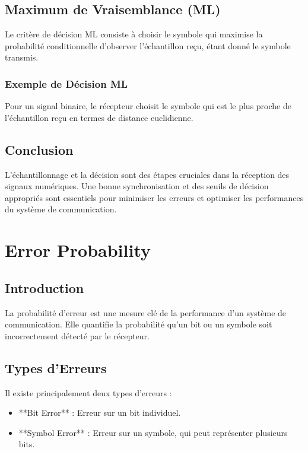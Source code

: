 \documentclass[10pt,a4paper]{article}
\begin{document}
\subsection*{Maximum de Vraisemblance (ML)}
Le critère de décision ML consiste à choisir le symbole qui maximise la probabilité conditionnelle d'observer l'échantillon reçu, étant donné le symbole transmis.

\subsubsection*{Exemple de Décision ML}
Pour un signal binaire, le récepteur choisit le symbole qui est le plus proche de l'échantillon reçu en termes de distance euclidienne.

\subsection*{Conclusion}
L'échantillonnage et la décision sont des étapes cruciales dans la réception des signaux numériques. Une bonne synchronisation et des seuils de décision appropriés sont essentiels pour minimiser les erreurs et optimiser les performances du système de communication.

\section*{Error Probability}

\subsection*{Introduction}
La probabilité d'erreur est une mesure clé de la performance d'un système de communication. Elle quantifie la probabilité qu'un bit ou un symbole soit incorrectement détecté par le récepteur.

\subsection*{Types d'Erreurs}
Il existe principalement deux types d'erreurs :
\begin{itemize}
    \item **Bit Error** : Erreur sur un bit individuel.
    \item **Symbol Error** : Erreur sur un symbole, qui peut représenter plusieurs bits.
\end{itemize}
\end{document}
